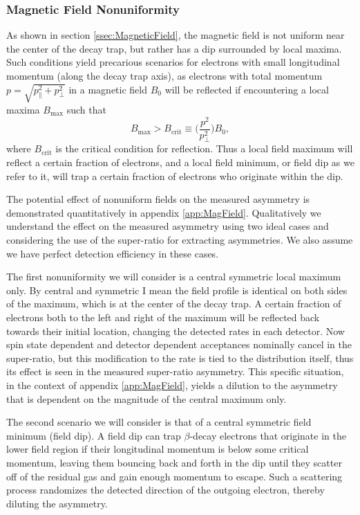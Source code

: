 \subsubsection{Magnetic Field Nonuniformity}

As shown in section \ref{ssec:MagneticField}, the magnetic field is not uniform
near the center of the decay trap, but rather has a dip surrounded by local maxima.
Such conditions yield precarious scenarios for electrons with small longitudinal momentum
(along the decay trap axis), as electrons with total momentum $p=\sqrt{p_\parallel^2 + p_\perp^2}$
in a magnetic field $B_0$ will be reflected if encountering a local maxima $B_{\mathrm{max}}$ such that
\begin{equation}
  B_{\mathrm{max}} > B_{\mathrm{crit}} \equiv \Big( \frac{p^2}{p_\perp^2} \Big) B_0,
\end{equation}
\noindent where $B_{\mathrm{crit}}$ is the critical condition for reflection. Thus a local field maximum
will reflect a certain fraction of electrons, and a local field minimum, or field dip as
we refer to it, will trap a certain fraction
of electrons who originate within the dip.

The potential effect of nonuniform fields on the measured asymmetry is demonstrated
quantitatively in appendix \ref{app:MagField}. Qualitatively we understand the effect on the
measured asymmetry using two ideal cases and considering the use
of the super-ratio for extracting asymmetries. We also assume we have perfect detection
efficiency in these cases.

The first nonuniformity we will consider
is a central symmetric local maximum only. By central and symmetric I mean the field profile is
identical on both sides of the maximum, which is at the center of the decay trap.
A certain fraction of electrons both to
the left and right of the maximum will be reflected back towards their initial location,
changing the detected rates in each detector. Now spin state dependent and detector dependent
acceptances nominally cancel in the super-ratio, but this modification to the rate is tied
to the distribution itself, thus its effect is seen in the measured super-ratio asymmetry.
This specific situation, in the context of appendix \ref{app:MagField}, yields a dilution
to the asymmetry that is dependent on the magnitude of the central maximum only.

The second scenario we will consider is that of a central symmetric field minimum (field dip).
A field dip can trap $\beta$-decay electrons
that originate in the lower field region if their longitudinal momentum is
below some critical momentum, leaving them bouncing back and forth in the dip until
they scatter off of the residual gas and gain enough momentum to escape. Such a scattering
process randomizes the detected direction of the outgoing electron, thereby diluting the
asymmetry.

